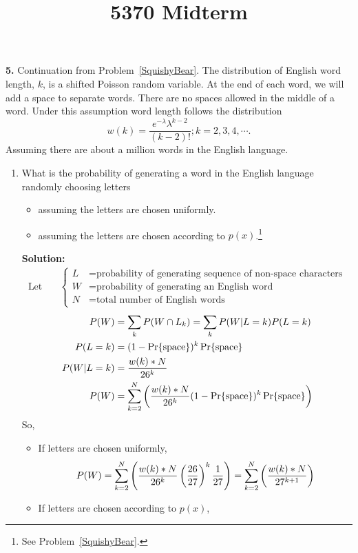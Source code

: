 \documentclass{assignment}
\begin{document}
\title{5370 Midterm}


\textbf{5.} \label{NewToyYoda}
Continuation from Problem~\ref{SquishyBear}.
The distribution of English word length, $k$, is a shifted Poisson random variable. At the end of each word, we will add a space to separate words. There are no spaces allowed in the middle of a word. Under this assumption word length follows the distribution
$$ w(k)=\frac{e^{-\lambda}\lambda^{k-2} }{(k-2)!} ; k=2,3,4,\cdots.$$
Assuming there are about a million words in the English language.
\begin{enumerate}
\item What is the probability of generating a word in the English language randomly choosing letters
  \begin{itemize}
  \item assuming the letters are chosen uniformly.
  \item assuming the letters are chosen according to $p(x)$.\footnote{See Problem~\ref{SquishyBear}.}
  \end{itemize}
  \textbf{Solution:} \\
  \begin{align*}
    \text{Let} \quad & \begin{cases}
      L & = \text{probability of generating sequence of non-space characters} \\
      W & = \text{probability of generating an English word} \\
      N & = \text{total number of English words}
    \end{cases}
  \end{align*}
  \begin{align*}
    P(W) & = \sum_k P(W \cap L_k) = \sum_k P(W|L=k)P(L=k) \\
    P(L=k) & = (1 - \Pr\{\text{space}\})^{k}\Pr\{\text{space}\}\\
    P(W|L=k) & = \dfrac{w(k) * N}{26^k} \\
    P(W) & = \sum_{k=2}^{N} \left(\dfrac{w(k) * N}{26^k} (1 - \Pr\{\text{space}\})^{k}\Pr\{\text{space}\}\right)
  \end{align*}
  So,
  \begin{itemize}
    \item If letters are chosen uniformly,
      $$P(W) = \sum_{k=2}^{N} \left(\dfrac{w(k) * N}{26^k} \left(\dfrac{26}{27}\right)^{k}\dfrac{1}{27}\right)
      = \sum_{k=2}^{N} \left(\dfrac{w(k) * N}{27^{k+1}} \right)$$
    \item If letters are chosen according to $p(x)$,

\end{itemize}
\end{enumerate}
\end{document}
